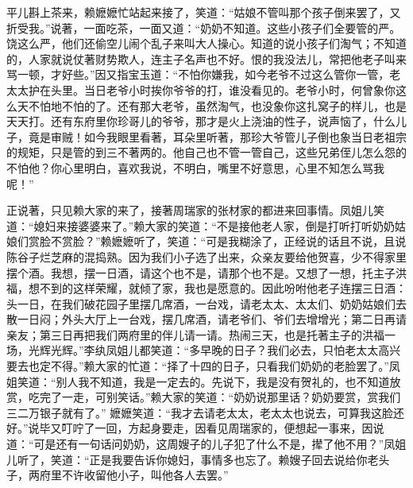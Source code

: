 \begin{parag}


    平儿斟上茶来，赖嬷嬷忙站起来接了，笑道：“姑娘不管叫那个孩子倒来罢了，又折受我。”说著，一面吃茶，一面又道：“奶奶不知道。这些小孩子们全要管的严。饶这么严，他们还偷空儿闹个乱子来叫大人操心。知道的说小孩子们淘气；不知道的，人家就说仗著财势欺人，连主子名声也不好。恨的我没法儿，常把他老子叫来骂一顿，才好些。”因又指宝玉道：“不怕你嫌我，如今老爷不过这么管你一管，老太太护在头里。当日老爷小时挨你爷爷的打，谁没看见的。老爷小时，何曾象你这么天不怕地不怕的了。还有那大老爷，虽然淘气，也没象你这扎窝子的样儿，也是天天打。还有东府里你珍哥儿的爷爷，那才是火上浇油的性子，说声恼了，什么儿子，竟是审贼！如今我眼里看著，耳朵里听著，那珍大爷管儿子倒也象当日老祖宗的规矩，只是管的到三不著两的。他自己也不管一管自己，这些兄弟侄儿怎么怨的不怕他？你心里明白，喜欢我说，不明白，嘴里不好意思，心里不知怎么骂我呢！”
\end{parag}


\begin{parag}


    正说著，只见赖大家的来了，接著周瑞家的张材家的都进来回事情。凤姐儿笑道：“媳妇来接婆婆来了。”赖大家的笑道：“不是接他老人家，倒是打听打听奶奶姑娘们赏脸不赏脸？”赖嬷嬷听了，笑道：“可是我糊涂了，正经说的话且不说，且说陈谷子烂芝麻的混捣熟。因为我们小子选了出来，众亲友要给他贺喜，少不得家里摆个酒。我想，摆一日酒，请这个也不是，请那个也不是。又想了一想，托主子洪福，想不到的这样荣耀，就倾了家，我也是愿意的。因此吩咐他老子连摆三日酒：头一日，在我们破花园子里摆几席酒，一台戏，请老太太、太太们、奶奶姑娘们去散一日闷；外头大厅上一台戏，摆几席酒，请老爷们、爷们去增增光；第二日再请亲友；第三日再把我们两府里的伴儿请一请。热闹三天，也是托著主子的洪福一场，光辉光辉。”李纨凤姐儿都笑道：“多早晚的日子？我们必去，只怕老太太高兴要去也定不得。”赖大家的忙道：“择了十四的日子，只看我们奶奶的老脸罢了。”凤姐笑道：“别人我不知道，我是一定去的。先说下，我是没有贺礼的，也不知道放赏，吃完了一走，可别笑话。”赖大家的笑道：“奶奶说那里话？奶奶要赏，赏我们三二万银子就有了。” 嬷嬷笑道：“我才去请老太太，老太太也说去，可算我这脸还好。”说毕又叮咛了一回，方起身要走，因看见周瑞家的，便想起一事来，因说道：“可是还有一句话问奶奶，这周嫂子的儿子犯了什么不是，撵了他不用？”凤姐儿听了，笑道：“正是我要告诉你媳妇，事情多也忘了。赖嫂子回去说给你老头子，两府里不许收留他小子，叫他各人去罢。”
\end{parag}


